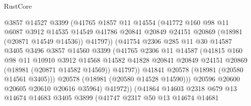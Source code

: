\begin{lexlean}{RustCore}
\begin{coremodule}
                        @3857
                        @14527
                        @3399
                        (@41765
                          @1857
                          @11
                          @14554
                          (@41772
                            @160
                            @98
                            @11
                            @6087
                            @3912
                            @14535
                            @14549
                            @41786
                            @20841
                            @20849
                            @24151
                            @20869
                            (@18981 (@20871 @14549 @14536))
                            @41797))
                        (@41754
                          @2306
                          @285
                          @11
                          @30
                          @14587
                          @3405
                          @3496
                          @3857
                          @14560
                          @3399
                          (@41765
                            @2306
                            @11
                            @14587
                            (@41815
                              @160
                              @98
                              @11
                              @10910
                              @3912
                              @14568
                              @14582
                              @41828
                              @20841
                              @20849
                              @24151
                              @20869
                              (@18981 (@20871 @14582 @14569))
                              @41797))
                          @41841
                          @20578
                          (@18981 (@20580 @14561 @3405)))
                        @20578
                        (@18981 (@20580 @14528 @14590)))
                      @20596
                      @20600
                      @20605
                      @20610
                      @20616
                      @35964)
                    @41972))
                (@41864
                  @14603
                  @2318
                  @679
                  @13
                  @14674
                  @14683
                  @3405
                  @3899
                  (@41747
                    @2317
                    @50
                    @13
                    @14674
                    @14681

\end{coremodule}
\end{lexlean}
